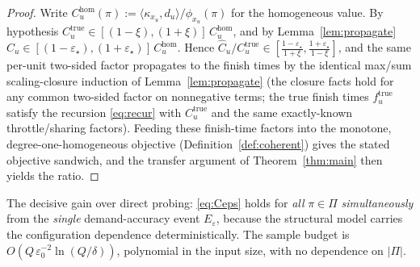 \documentclass{amsart}
\theoremstyle{definition}
\newcommand{\Chat}{\widehat{C}}
\begin{document}
\begin{proof}
Write $C_u^{\mathrm{hom}}(\pi):=\langle\kappa_{x_u},d_u\rangle/\phi_{x_u}(\pi)$
for the homogeneous value. By hypothesis
$C_u^{\mathrm{true}}\in[(1-\xi),(1+\xi)]\,C_u^{\mathrm{hom}}$, and by
Lemma~\ref{lem:propagate} $\Chat_u\in[(1-\varepsilon_\star),(1+\varepsilon_\star)]
\,C_u^{\mathrm{hom}}$. Hence
$\Chat_u/C_u^{\mathrm{true}}\in[\frac{1-\varepsilon_\star}{1+\xi},
\frac{1+\varepsilon_\star}{1-\xi}]$, and the same per-unit two-sided factor
propagates to the finish times by the identical max/sum scaling-closure
induction of Lemma~\ref{lem:propagate} (the closure facts hold for any common
two-sided factor on nonnegative terms; the true finish times $f_u^{\mathrm{true}}$
satisfy the recursion \eqref{eq:recur} with $C_u^{\mathrm{true}}$ and the same
exactly-known throttle/sharing factors). Feeding these finish-time factors into
the monotone, degree-one-homogeneous objective (Definition~\ref{def:coherent})
gives the stated objective sandwich, and the transfer argument of
Theorem~\ref{thm:main} then yields the ratio.
\end{proof}

The decisive gain over direct probing: \eqref{eq:Ceps} holds for \emph{all}
$\pi\in\Pi$ \emph{simultaneously} from the \emph{single} demand-accuracy event
$E_\varepsilon$, because the structural model carries the configuration
dependence deterministically. The sample budget is $O(Q\,\varepsilon_0^{-2}
\ln(Q/\delta))$, polynomial in the input size, with no dependence on $|\Pi|$.
\end{document}
